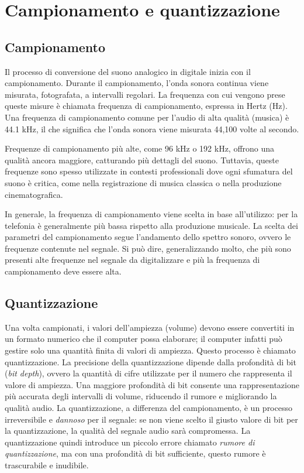 \documentclass{book}
\begin{document}
\section{Campionamento e quantizzazione}

\subsection{Campionamento}

Il processo di conversione del suono analogico in digitale inizia con il campionamento. Durante il campionamento, l’onda sonora continua viene misurata, fotografata, a intervalli regolari. La frequenza con cui vengono prese queste misure è chiamata frequenza di campionamento, espressa in Hertz (Hz). Una frequenza di campionamento comune per l’audio di alta qualità (musica) è 44.1 kHz, il che significa che l’onda sonora viene misurata 44,100 volte al secondo.

Frequenze di campionamento più alte, come 96 kHz o 192 kHz, offrono una qualità ancora maggiore, catturando più dettagli del suono. Tuttavia, queste frequenze sono spesso utilizzate in contesti professionali dove ogni sfumatura del suono è critica, come nella registrazione di musica classica o nella produzione cinematografica.

In generale, la frequenza di campionamento viene scelta in base all’utilizzo: per la telefonia è generalmente più bassa rispetto alla produzione musicale. La scelta dei parametri del campionamento segue l’andamento dello spettro sonoro, ovvero le frequenze contenute nel segnale. Si può dire, generalizzando molto, che più sono presenti alte frequenze nel segnale da digitalizzare e più la frequenza di campionamento deve essere alta.

\subsection{Quantizzazione}

Una volta campionati, i valori dell’ampiezza (volume) devono essere convertiti in un formato numerico che il computer possa elaborare; il computer infatti può gestire solo una quantità finita di valori di ampiezza. Questo processo è chiamato quantizzazione. La precisione della quantizzazione dipende dalla profondità di bit (\emph{bit depth}), ovvero la quantità di cifre utilizzate per il numero che rappresenta il valore di ampiezza. Una maggiore profondità di bit consente una rappresentazione più accurata degli intervalli di volume, riducendo il rumore e migliorando la qualità audio. La quantizzazione, a differenza del campionamento, è un processo irreversibile e \emph{dannoso} per il segnale: se non viene scelto il giusto valore di bit per la quantizzazione, la qualità del segnale audio sarà compromessa. La quantizzazione quindi introduce un piccolo errore chiamato \emph{rumore di quantizzazione}, ma con una profondità di bit sufficiente, questo rumore è trascurabile e inudibile.
\end{document}
